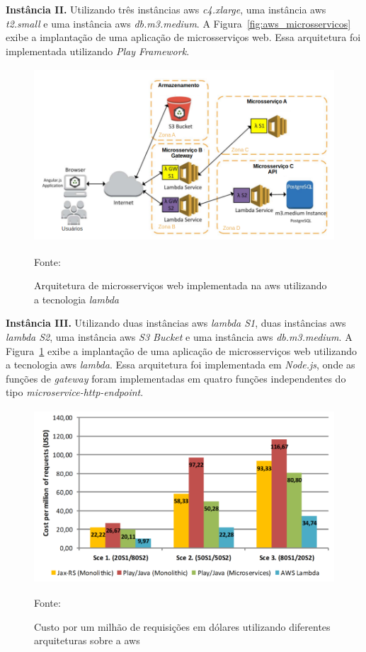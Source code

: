 \textbf{Instância II.} Utilizando três instâncias \ac{aws} \textit{c4.xlarge}, uma instância \ac{aws} \textit{t2.small} e uma instância \ac{aws} \textit{db.m3.medium}.
%
A Figura~\ref{fig:aws_microsservicos} exibe a implantação de uma aplicação de microsserviços web. Essa arquitetura foi implementada utilizando \textit{Play Framework}. %



\begin{figure}[htb!]
\caption{Arquitetura de microsserviços web implementada na \ac{aws} utilizando a tecnologia \textit{lambda}}
\label{fig:aws_lambda}
\includegraphics[height=6.5cm]{img/cap2/aws_lambda.png}
\centering

Fonte:~\cite{7515686}
\end{figure}

\textbf{Instância III.} Utilizando duas instâncias \ac{aws} \textit{lambda S1}, duas instâncias \ac{aws} \textit{lambda S2}, uma instância \ac{aws} \textit{S3 Bucket} e uma instância \ac{aws} \textit{db.m3.medium}.
%
A Figura~\ref{fig:aws_lambda} exibe a implantação de uma aplicação de microsserviços web utilizando a tecnologia \ac{aws} \textit{lambda}. Essa arquitetura foi implementada em \textit{Node.js}, onde as funções de \textit{gateway} foram implementadas em quatro funções independentes do tipo \textit{microservice-http-endpoint}. %



\begin{figure}[htb!]
\caption{Custo por um milhão de requisições em dólares utilizando diferentes arquiteturas sobre a \ac{aws}}
\label{fig:custo_aws}
\includegraphics[height=6.5cm]{img/cap2/custo_aws.png}
\centering

Fonte:~\cite{7515686}
\end{figure}



